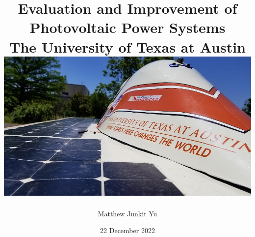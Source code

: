 \documentclass[12pt]{report}
\begin{document}
\title {
    {Evaluation and Improvement of Photovoltaic Power Systems}\\
    {\large The University of Texas at Austin}\\
    {\includegraphics[width=\textwidth]{lonestar_cover.jpg}}
}
\author{Matthew Junkit Yu}
\date{22 December 2022}
\maketitle

{
    \hypersetup{linkcolor=black}
    \tableofcontents
    \listoffigures
    \listoftables
}






{
    \hypersetup{linkcolor=black}
    \printbibliography[heading=bibintoc]
    \begin{appendices}
        
        
        
        
        
        
    \end{appendices}
    \listoftodos[TODOS]
}
\end{document}
